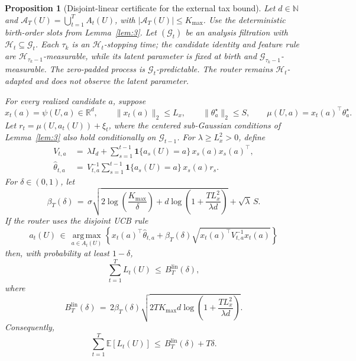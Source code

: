 \documentclass{article} %
\newtheorem{proposition}[theorem]{Proposition}
\begin{document}
\begin{proposition}[Disjoint-linear certificate for the external tax bound]
\label{prop:2}
Let \(d\in\mathbb N\) and
\(\mathcal A_T(U)=\bigcup_{t=1}^T A_t(U)\), with
\(|\mathcal A_T(U)|\leq K_{\max}\).  Use the deterministic birth-order slots
from Lemma~\ref{lem:3}.  Let \((\mathcal G_t)\) be an analysis filtration with
\(\mathcal H_t\subseteq\mathcal G_t\).  Each \(\tau_k\) is an
\(\mathcal H_t\)-stopping time; the candidate identity and feature rule are
\(\mathcal H_{\tau_k-1}\)-measurable, while its latent parameter is fixed at
birth and \(\mathcal G_{\tau_k-1}\)-measurable.  The zero-padded process is
\(\mathcal G_t\)-predictable.  The router remains \(\mathcal H_t\)-adapted and
does not observe the latent parameter.

For every realized candidate \(a\), suppose
\begin{equation}
x_t(a)=\psi(U,a)\in\mathbb R^d,\qquad
\|x_t(a)\|_2\leq L_x,\qquad
\|\theta_a^\star\|_2\leq S,\qquad
\mu(U,a)=x_t(a)^\top\theta_a^\star.
\end{equation}
Let \(r_t=\mu(U,a_t(U))+\xi_t\), where the centered sub-Gaussian conditions of
Lemma~\ref{lem:3} also hold conditionally on \(\mathcal G_{t-1}\).  For
\(\lambda\geq L_x^2>0\), define
\begin{equation}
\begin{aligned}
V_{t,a}
&\,=\,
\lambda I_d
+
\sum_{s=1}^{t-1}
\mathbf{1}\{a_s(U)=a\}\,x_s(a)x_s(a)^\top, \\
\widehat{\theta}_{t,a}
&\,=\,
V_{t,a}^{-1}
\sum_{s=1}^{t-1}
\mathbf{1}\{a_s(U)=a\}\,x_s(a)r_s.
\end{aligned}
\end{equation}
For \(\delta\in(0,1)\), let
\begin{equation}
\beta_T(\delta)
\,=\,
\sigma
\sqrt{
2\log\!\left(\frac{K_{\max}}{\delta}\right)
+
d\log\!\left(1+\frac{T L_x^2}{\lambda d}\right)
}
+
\sqrt{\lambda}\,S.
\end{equation}
If the router uses the disjoint UCB rule
\begin{equation}
a_t(U)
\,\in\,
\operatorname*{arg\,max}_{a\in A_t(U)}
\left\{
x_t(a)^\top\widehat{\theta}_{t,a}
+
\beta_T(\delta)
\sqrt{x_t(a)^\top V_{t,a}^{-1}x_t(a)}
\right\}
\end{equation}
then, with probability at least \(1-\delta\),
\begin{equation}
\sum_{t=1}^{T}L_t(U)
\,\leq\,
B_T^{\mathrm{lin}}(\delta),
\end{equation}
where
\begin{equation}
B_T^{\mathrm{lin}}(\delta)
\,=\,
2\beta_T(\delta)
\sqrt{
2T K_{\max} d
\log\!\left(1+\frac{T L_x^2}{\lambda d}\right)
}.
\end{equation}
Consequently,
\begin{equation}
\sum_{t=1}^{T}\mathbb{E}[L_t(U)]
\,\leq\,
B_T^{\mathrm{lin}}(\delta)+T\delta.
\end{equation}
\end{proposition}
\end{document}
